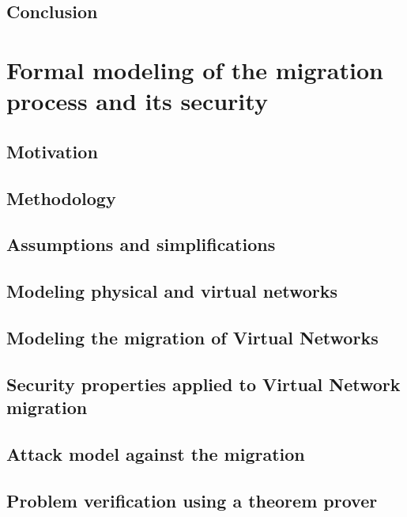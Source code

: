 \documentclass[a4paper, 11pt]{article}
\begin{document}
\subsection{Conclusion}


\newpage
\section{Formal modeling of the migration process and its security}
\subsection{Motivation}


\subsection{Methodology}


\subsection{Assumptions and simplifications}


\subsection{Modeling physical and virtual networks}


\subsection{Modeling the migration of Virtual Networks}


\subsection{Security properties applied to Virtual Network migration}


\subsection{Attack model against the migration}


\subsection{Problem verification using a theorem prover}

\end{document}
